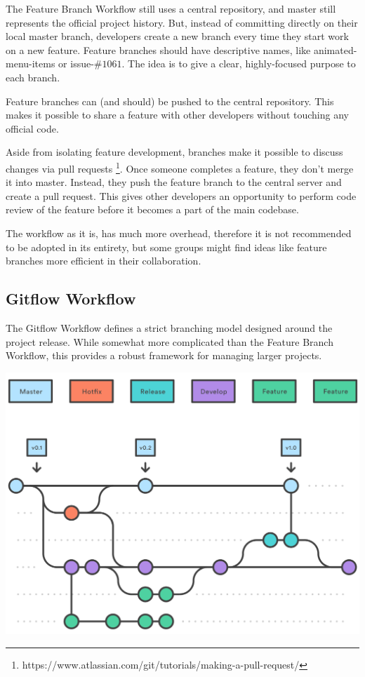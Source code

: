 \documentclass{article}
\begin{document}
The Feature Branch Workflow still uses a central repository, and
master still represents the official project history. But, instead of
committing directly on their local master branch, developers create a
new branch every time they start work on a new feature. Feature
branches should have descriptive names, like animated-menu-items or
issue-$\#1061$. The idea is to give a clear, highly-focused purpose to
each branch.

Feature branches can (and should) be pushed to the central
repository. This makes it possible to share a feature with other
developers without touching any official code.

Aside from isolating feature development, branches make it possible to
discuss changes via pull requests
\footnote{https://www.atlassian.com/git/tutorials/making-a-pull-request/}. 
Once someone completes a feature,
they don't merge it into master. Instead, they push the
feature branch to the central server and create a pull request. This
gives other developers an opportunity to perform code review of the
feature before it becomes a part of the main codebase.

The workflow as it is, has much more overhead, therefore it is not
recommended to be adopted in its entirety, but some groups might find
ideas like feature branches more efficient in their collaboration. 




\subsection{Gitflow Workflow}

The Gitflow Workflow defines a strict branching model designed around
the project release. While somewhat more complicated than the Feature
Branch Workflow, this provides a robust framework for managing larger
projects.

\begin{center}
\includegraphics[scale=0.5]{figures/16.pdf}
\end{center}
\end{document}
